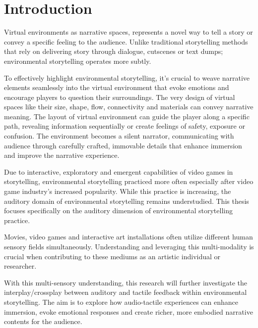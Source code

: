 \chapter{Introduction}
Virtual environments as narrative spaces, represents a novel way to tell a story or convey a specific feeling to the audience. Unlike traditional storytelling methods that rely on delivering story through dialogue, cutscenes or text dumps; environmental storytelling operates more subtly.\par

To effectively highlight environmental storytelling, it’s crucial to weave narrative elements seamlessly into the virtual environment that evoke emotions and encourage players to question their surroundings. The very design of virtual spaces like their size, shape, flow, connectivity and materials can convey narrative meaning. The layout of virtual environment can guide the player along a specific path, revealing information sequentially or create feelings of safety, exposure or confusion. The environment becomes a silent narrator, communicating with audience through carefully crafted, immovable details that enhance immersion and improve the narrative experience\cite{Environmental_Storytelling_Blogpost}.\par

Due to interactive, exploratory and emergent capabilities of video games in storytelling, environmental storytelling practiced more often especially after video game industry's increased popularity\cite{Video_Game_Industry_Stat}. While this practice is increasing, the auditory domain of environmental storytelling remains understudied. This thesis focuses specifically on the auditory dimension of environmental storytelling practice.\par

Movies, video games and interactive art installations often utilize different human sensory fields simultaneously. Understanding and leveraging this multi-modality is crucial when contributing to these mediums as an artistic individual or researcher.\par

With this multi-sensory understanding, this research will further investigate the interplay/crossplay between auditory and tactile feedback within environmental storytelling. The aim is to explore how audio-tactile experiences can enhance immersion, evoke emotional responses and create richer, more embodied narrative contents for the audience.\par
